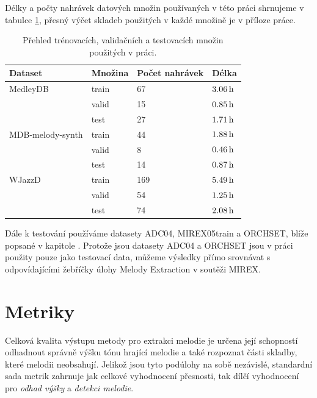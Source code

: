 Délky a počty nahrávek datových množin používaných v této práci shrnujeme v tabulce \ref{tab:data_splits}, přesný výčet skladeb použitých v každé množině je v příloze práce.

\begin{table}[h!]
\centering
\begin{tabular}{llll}
\toprule
Dataset          & Množina & Počet nahrávek & Délka \\
\midrule
MedleyDB         & train   & 67             & $3.06\,\rm h$ \\
                 & valid   & 15             & $0.85\,\rm h$ \\
                 & test    & 27             & $1.71\,\rm h$ \\
MDB-melody-synth & train   & 44             & $1.88\,\rm h$ \\
                 & valid   & 8              & $0.46\,\rm h$ \\
                 & test    & 14             & $0.87\,\rm h$ \\
WJazzD           & train   & 169            & $5.49\,\rm h$ \\
                 & valid   & 54             & $1.25\,\rm h$ \\
                 & test    & 74             & $2.08\,\rm h$ \\
\bottomrule
\end{tabular}
\caption{Přehled trénovacích, validačních a testovacích množin použitých v práci.}\label{tab:data_splits}
\end{table}

Dále k testování používáme datasety ADC04, MIREX05train a ORCHSET, blíže popsané v kapitole . Protože jsou datasety ADC04 a ORCHSET jsou v práci použity pouze jako testovací data, můžeme výsledky přímo srovnávat s odpovídajícími žebříčky úlohy Melody Extraction v soutěži MIREX.




\section{Metriky}

Celková kvalita výstupu metody pro extrakci melodie je určena její schopností odhadnout správně výšku tónu hrající melodie a také rozpoznat části skladby, které melodii neobsahují. Jelikož jsou tyto podúlohy na sobě nezávislé, standardní sada metrik zahrnuje jak celkové vyhodnocení přesnosti, tak dílčí vyhodnocení pro \textit{odhad výšky} a \textit{detekci melodie}. 

